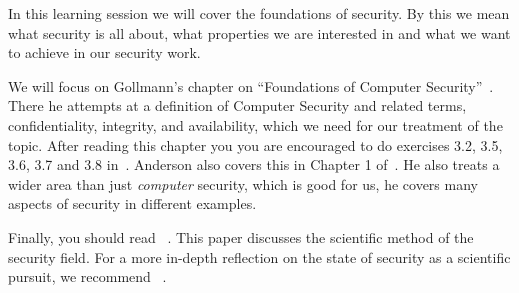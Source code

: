 In this learning session we will cover the foundations of security.
By this we mean what security is all about, \eg what properties we are 
interested in and what we want to achieve in our security work.

We will focus on Gollmann's chapter on \enquote{Foundations of Computer 
Security}~\cite[Chap.\ 3]{Gollmann2011cs}.
There he attempts at a definition of Computer Security and related terms, \eg 
confidentiality, integrity, and availability, which we need for our treatment of 
the topic.
After reading this chapter you you are encouraged to do exercises 3.2, 3.5, 
3.6, 3.7 and 3.8 in~\cite{Gollmann2011cs}.
Anderson also covers this in Chapter 1 of~\cite{Anderson2008sea}.
He also treats a wider area than just \emph{computer} security, which is good 
for us, he covers many aspects of security in different examples.

Finally, you should read 
~\cite{HowToDesignSecurityExperiments}.
This paper discusses the scientific method of the security field.
For a more in-depth reflection on the state of security as a scientific pursuit, 
we recommend ~\cite{SecurityAsAScience}.
